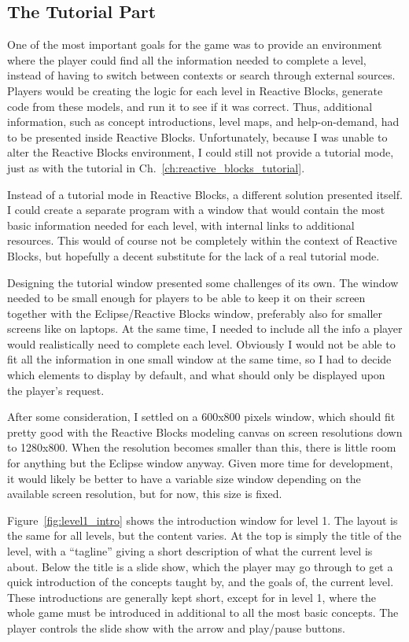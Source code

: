 \subsection{The Tutorial Part}
\label{sec:game_tutorial}
One of the most important goals for the game was to provide an environment where the player could find all the information needed to complete a level, instead of having to switch between contexts or search through external sources. Players would be creating the logic for each level in Reactive Blocks, generate code from these models, and run it to see if it was correct. Thus, additional information, such as concept introductions, level maps, and help-on-demand, had to be presented inside Reactive Blocks. Unfortunately, because I was unable to alter the Reactive Blocks environment, I could still not provide a tutorial mode, just as with the tutorial in Ch.~\ref{ch:reactive_blocks_tutorial}.

\noindent
Instead of a tutorial mode in Reactive Blocks, a different solution presented itself. I could create a separate program with a window that would contain the most basic information needed for each level, with internal links to additional resources. This would of course not be completely within the context of Reactive Blocks, but hopefully a decent substitute for the lack of a real tutorial mode.

\noindent
Designing the tutorial window presented some challenges of its own. The window needed to be small enough for players to be able to keep it on their screen together with the Eclipse/Reactive Blocks window, preferably also for smaller screens like on laptops. At the same time, I needed to include all the info a player would realistically need to complete each level. Obviously I would not be able to fit all the information in one small window at the same time, so I had to decide which elements to display by default, and what should only be displayed upon the player's request.

\noindent
After some consideration, I settled on a 600x800 pixels window, which should fit pretty good with the Reactive Blocks modeling canvas on screen resolutions down to 1280x800. When the resolution becomes smaller than this, there is little room for anything but the Eclipse window anyway. Given more time for development, it would likely be better to have a variable size window depending on the available screen resolution, but for now, this size is fixed.

\noindent
Figure~\ref{fig:level1_intro} shows the introduction window for level 1. The layout is the same for all levels, but the content varies. At the top is simply the title of the level, with a ``tagline'' giving a short description of what the current level is about. Below the title is a slide show, which the player may go through to get a quick introduction of the concepts taught by, and the goals of, the current level. These introductions are generally kept short, except for in level 1, where the whole game must be introduced in additional to all the most basic concepts. The player controls the slide show with the arrow and play/pause buttons.

